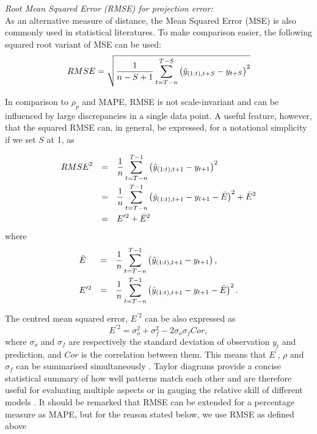 \vspace{0.2cm} \noindent
{\it Root Mean Squared Error (RMSE) for projection error:}\\
As an alternative measure of distance, the Mean Squared Error (MSE) is also commonly used in statistical literatures. To make comparison easier, the following squared root variant of MSE can be used: 
\begin{equation}
RMSE = \displaystyle \sqrt{ \frac{1}{n-S+1} \sum_{t=T-n}^{T-S} 
\left( \hat{y}_{(1:t),t+S}-y_{t+S} \right)^2 }
\end{equation} 

In comparison to $\rho_p$ and MAPE, RMSE is not scale-invariant and can be influenced by large discrepancies in a single data point. A useful feature, however, that the squared RMSE can, in general, be expressed,  for a notational simplicity if we set $S$ at 1, as

\begin{equation}
\begin{array}{lcl}
\vspace{0.1cm}
{RMSE}^2 &=& \disp \frac{1}{n} \sum_{t=T-n}^{T-1} \left( \hat{y}_{(1:t),t+1}-y_{t+1} \right)^2 \\
\vspace{0.1cm}
&=& \disp \frac{1}{n} \sum_{t=T-n}^{T-1} \left( \hat{y}_{(1:t),t+1}-y_{t+1} - \bar{E} \right)^2 + \bar{E}^2 \\
&=& \disp E^{\prime 2} + \bar{E}^2
\end{array}
\end{equation}
where 
\begin{equation}
\begin{array}{lcl}
\vspace{0.1cm}
\bar{E} &=& \disp \frac{1}{n} \sum_{t=T-n}^{T-1} \left( \hat{y}_{(1:t),t+1}-y_{t+1} \right), \\
\vspace{0.1cm}
E^{\prime 2} &=& \disp \frac{1}{n} \sum_{t=T-n}^{T-1} \left( \hat{y}_{(1:t),t+1}-y_{t+1} - \bar{E} \right)^2.
\end{array}
\end{equation}
The centred mean squared error, $E^{\prime 2}$ can be also expressed as 
\begin{equation}
E^{\prime 2} = \sigma_o^2 + \sigma_f^2 - 2\sigma_o \sigma_f Cor,
\end{equation}
where $\sigma_o$ and $\sigma_f$ are respectively the standard deviation of observation $y_t$ and prediction, and $Cor$ is the correlation between them. This means that $E^\prime$, $\rho$ and $\sigma_f$ can be summarised simultaneously \citep{taylor2001summarizing}. Taylor diagrams provide a concise statistical summary of how well patterns match each other and are therefore useful for evaluating multiple aspects or in gauging the relative skill of different models \citep{griggs2002climate}. It should be remarked that RMSE can be extended for a percentage measure as MAPE, but for the reason stated below, we use RMSE as defined above 

